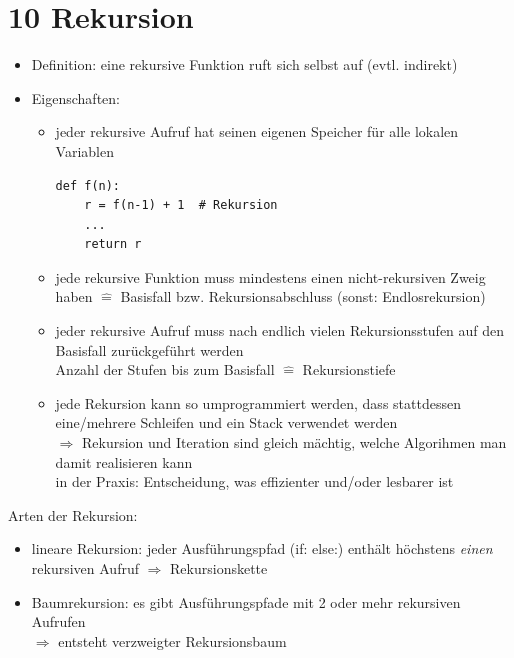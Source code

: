 \documentclass[11pt, fleqn]{scrreprt}
\begin{document}
\chapter*{10 Rekursion}
\begin{itemize}[label={}]
    \item \hspace*{-1cm} Definition: eine rekursive Funktion ruft sich selbst auf (evtl. indirekt)
    \item \hspace*{-1cm} Eigenschaften:
    \begin{itemize}
        \item jeder rekursive Aufruf hat seinen eigenen Speicher für alle lokalen Variablen
        \begin{verbatim}
def f(n):
    r = f(n-1) + 1  # Rekursion
    ...
    return r
        \end{verbatim}
        \item jede rekursive Funktion muss mindestens einen nicht-rekursiven Zweig haben $\widehat{=}$ Basisfall bzw. Rekursionsabschluss (sonst: Endlosrekursion)
        \item jeder rekursive Aufruf muss nach endlich vielen Rekursionsstufen auf den Basisfall zurückgeführt werden \\
        Anzahl der Stufen bis zum Basisfall $\widehat{=}$ Rekursionstiefe
        \item jede Rekursion kann so umprogrammiert werden, dass stattdessen eine/mehrere Schleifen und ein Stack verwendet werden \\
        $\Rightarrow$ Rekursion und Iteration sind gleich mächtig, welche Algorihmen man damit realisieren kann \\
        in der Praxis: Entscheidung, was effizienter und/oder lesbarer ist
    \end{itemize}
\end{itemize}

Arten der Rekursion:
\begin{itemize}
    \item lineare Rekursion: jeder Ausführungspfad (if: else:) enthält höchstens \emph{einen} rekursiven Aufruf $\Rightarrow$ Rekursionskette
    \item Baumrekursion: es gibt Ausführungspfade mit 2 oder mehr rekursiven Aufrufen \\
    $\Rightarrow$ entsteht verzweigter Rekursionsbaum
\end{itemize}
\end{document}
